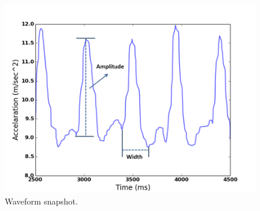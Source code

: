 \begin{figure}
\includegraphics[width=\columnwidth]{figure/waveform.png}
\centering
\caption{\label{fig:waveform}Waveform snapshot.}
\end{figure}

